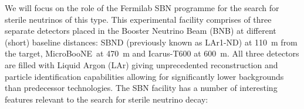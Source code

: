 \documentclass[11pt, a4paper]{article}
\def\muboone{MicroBooNE}
\newcommand{\newtext}[2]{\textcolor{#1}{\ul{#2}}}
\begin{document}
We will focus on the role of the Fermilab SBN programme
\cite{Antonello:2015lea} for the search for sterile neutrinos of this type.
%
This experimental facility comprises of three separate detectors placed in the
Booster Neutrino Beam (BNB) at different (short) baseline distances: SBND
(previously known as LAr1-ND) at 110~m from the target, \muboone\ at 470~m and
Icarus-T600 at 600~m.  All three detectors are filled with Liquid Argon (LAr)
giving unprecedented reconstruction and particle identification capabilities
allowing for significantly lower backgrounds than predecessor technologies. 
%
%
The SBN facility has a number of interesting features relevant to the 
search for sterile neutrino decay:
\end{document}
